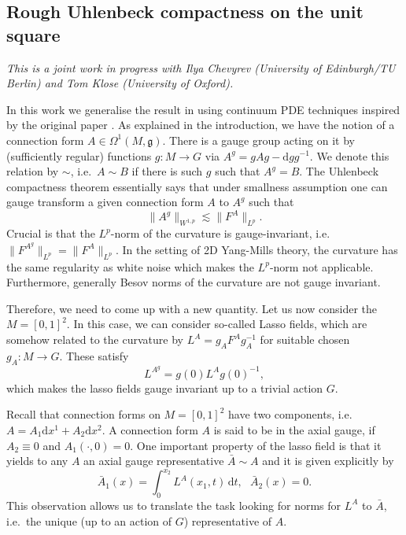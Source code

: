 \documentclass[12pt]{article}
\numberwithin{equation}{section}
\theoremstyle{definition}
\theoremstyle{remark}
\newcommand{\dif}{\,\mathrm{d}}
\newcommand{\diff}{\mathrm{d}}
\newcommand{\1}{\mathbf 1}
\newcommand{\<}{\langle}
\renewcommand{\>}{\rangle}
\begin{document}

\subsection{Rough Uhlenbeck compactness on the unit square}\label{sec:RUC_square}
\textit{This is a joint work in progress with Ilya Chevyrev (University of Edinburgh/TU Berlin) and Tom Klose (University of Oxford).}

\medskip

\noindent In this work we generalise the result in \cite{Chevyrev19} using continuum PDE techniques inspired by the original paper \cite{Uhlenbeck82}. As explained in the introduction, we have the notion of a connection form $A\in\Omega^1(M,\mathfrak g)$. There is a gauge group acting on it by (sufficiently regular) functions $g:M\to G$ via $A^g=gAg-\diff gg^{-1}$. We denote this relation by $\sim$, i.e.\ $A\sim B$ if there is such $g$ such that $A^g=B$.  The Uhlenbeck compactness theorem essentially says that under smallness assumption one can gauge transform a given connection form $A$ to $A^g$ such that 
\[
\|A^g\|_{W^{1,p}}\lesssim \|F^A\|_{L^p}.
\]
Crucial is that the $L^p$-norm of the curvature is gauge-invariant, i.e.\ $\|F^{A^g}\|_{L^p}=\|F^A\|_{L^p}$. In the setting of 2D Yang-Mills theory, the curvature has the same regularity as white noise which makes the $L^p$-norm not applicable. Furthermore, generally Besov norms of the curvature are not gauge invariant.

Therefore, we need to come up with a new quantity. Let us now consider the $M=[0,1]^2$. In this case, we can consider so-called Lasso fields, which are somehow related to the curvature by $L^A=g_AF^Ag_A^{-1}$ for suitable chosen $g_A:M\to G$. These satisfy 
\[
L^{A^g}=g(0)L^Ag(0)^{-1},
\]
which makes the lasso fields  gauge invariant up to a trivial action $G$. 

Recall that connection forms on $M=[0,1]^2$ have two components, i.e.\ $A=A_1\diff x^1+A_2\diff x^2$. A connection form $A$ is said to be in the axial gauge, if $A_2\equiv 0$ and $A_1(\cdot,0)=0$. One important property of the lasso field is that it yields to any $A$ an axial gauge representative $\bar A\sim A$ and it is given explicitly by 
\[
\bar A_1(x)=\int^{x_2}_0 L^A(x_1,t)\dif t, \ \ \  \bar A_2(x)=0. 
\]
This observation allows us to translate the task looking for norms for $L^A$ to $\bar A$, i.e.\ the unique (up to an action of $G$) representative of $A$. 
\end{document}
